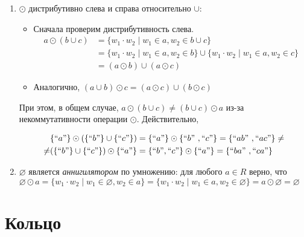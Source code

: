 \begin{example}
\begin{enumerate}
		\item $\odot$ дистрибутивно слева и справа относительно $\cup$:
		      \begin{itemize}
			      \item Сначала проверим дистрибутивность слева.
			            \begin{align*}
				            a \odot (b \cup c) & = \{ w_1 \cdot w_2 \mid  w_1 \in a, w_2 \in b \cup c\}                                                \\
				                               & = \{ w_1 \cdot w_2 \mid  w_1 \in a, w_2 \in b \} \cup  \{ w_1 \cdot w_2 \mid  w_1 \in a, w_2 \in c \} \\
				                               & =  (a \odot b) \cup (a \odot c)
			            \end{align*}

			      \item Аналогично, $(a \cup b) \odot c = (a \odot c) \cup (b \odot c)$
		      \end{itemize}
		      При этом, в общем случае, $a \odot (b \cup c) \neq (b \cup c) \odot a$ из-за некоммутативности операции $\odot$. Действительно,

		      \begin{align*}
			           & \{``a"\}\odot(\{``b"\} \cup \{``c"\}) = \{``a"\}\odot \{``b" \ ,``c" \} =  \{``ab"\ ,``ac" \} \neq \\
			      \neq & (\{``b"\} \cup \{``c"\}) \odot \{``a"\} =  \{``b",``c" \} \odot \{``a"\} =  \{``ba"\ ,``ca" \}
		      \end{align*}


		\item $\varnothing$ является \textit{аннигилятором} по умножению: для любого $a \in R$ верно, что
		      $\varnothing \odot a =  \{ w_1 \cdot w_2 \mid w_1 \in \varnothing, w_2 \in a \} =  \{ w_1 \cdot w_2 \mid w_1 \in a, w_2 \in \varnothing \} = a \odot \varnothing = \varnothing$

	\end{enumerate}

\end{example}

\section{Кольцо}


